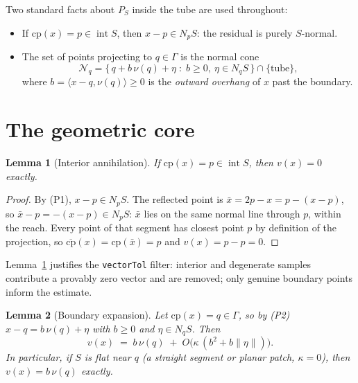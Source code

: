 \documentclass[11pt]{article}
\newtheorem{lemma}{Lemma}
\newcommand{\cp}{\mathrm{cp}}
\newcommand{\cpbar}{\overline{\mathrm{cp}}}
\newcommand{\intr}{\operatorname{int}}
\newcommand{\norm}[1]{\lVert #1 \rVert}
\newcommand{\ip}[2]{\langle #1, #2 \rangle}
\begin{document}
Two standard facts about $P_S$ inside the tube are used throughout:
\begin{itemize}
\item[(P1)] If $\cp(x)=p\in\intr S$, then $x-p\in N_pS$: the residual is
  purely $S$-normal.
\item[(P2)] The set of points projecting to $q\in\Gamma$ is the normal
  cone
  \[
    \mathcal N_q=\bigl\{\,q+b\,\nu(q)+\eta \;:\; b\ge 0,\ \eta\in
    N_qS\,\bigr\}\cap\{\text{tube}\},
  \]
  where $b=\ip{x-q}{\nu(q)}\ge 0$ is the \emph{outward overhang} of $x$
  past the boundary.
\end{itemize}

\section{The geometric core}

\begin{lemma}[Interior annihilation]\label{lem:interior}
If $\cp(x)=p\in\intr S$, then $v(x)=0$ exactly.
\end{lemma}

\begin{proof}
By (P1), $x-p\in N_pS$. The reflected point is
$\bar x = 2p-x = p-(x-p)$, so $\bar x - p = -(x-p)\in N_pS$: $\bar x$
lies on the same normal line through $p$, within the reach. Every point
of that segment has closest point $p$ by definition of the projection,
so $\cpbar(x)=\cp(\bar x)=p$ and $v(x)=p-p=0$.
\end{proof}

Lemma~\ref{lem:interior} justifies the \texttt{vectorTol} filter:
interior and degenerate samples contribute a provably zero vector and
are removed; only genuine boundary points inform the estimate.

\begin{lemma}[Boundary expansion]\label{lem:boundary}
Let $\cp(x)=q\in\Gamma$, so by \textup{(P2)} $x-q = b\,\nu(q)+\eta$ with
$b\ge 0$ and $\eta\in N_qS$. Then
\[
  v(x) \;=\; b\,\nu(q) \;+\; O\!\bigl(\kappa\,(b^2+b\norm{\eta})\bigr).
\]
In particular, if $S$ is flat near $q$ (a straight segment or planar
patch, $\kappa=0$), then $v(x)=b\,\nu(q)$ exactly.
\end{lemma}
\end{document}
